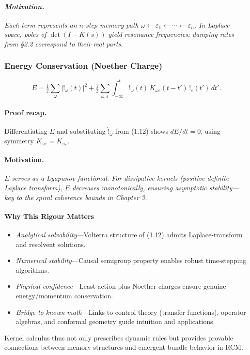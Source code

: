 \paragraph{\textit{Motivation.}}  
\textit{Each term represents an \(n\)-step memory path \(\omega\leftarrow\varepsilon_{1}\leftarrow\cdots\leftarrow\varepsilon_{n}\).  In Laplace space, poles of \(\det(I-K(s))\) yield resonance frequencies; damping rates from §2.2 correspond to their real parts.}

\medskip
\subsubsection{Energy Conservation (Noether Charge)}
\[
  E
  = \tfrac12\sum_{\omega}|!_{\omega}(t)|^{2}
    + \tfrac12\sum_{\omega,\varepsilon}
      \int_{-\infty}^{t}
        !_{\omega}(t)\,K_{\omega\varepsilon}(t-t')\,!_{\varepsilon}(t')\,dt'.
\]

\paragraph{Proof recap.}  
Differentiating \(E\) and substituting \(\dot{!}_{\omega}\) from (1.12) shows \(dE/dt=0\), using symmetry \(K_{\omega\varepsilon}=K_{\varepsilon\omega}\).

\paragraph{\textbf{Motivation.}}  
\textit{\(E\) serves as a Lyapunov functional.  For dissipative kernels (positive‐definite Laplace transform), \(E\) decreases monotonically, ensuring asymptotic stability—key to the spiral coherence bounds in Chapter 3.}

\medskip
\paragraph{Why This Rigour Matters}
\begin{itemize}
  \item \emph{Analytical solvability}—Volterra structure of (1.12) admits Laplace‐transform and resolvent solutions.
  \item \emph{Numerical stability}—Causal semigroup property enables robust time‐stepping algorithms.
  \item \emph{Physical confidence}—Least‐action plus Noether charges ensure genuine energy/momentum conservation.
  \item \emph{Bridge to known math}—Links to control theory (transfer functions), operator algebras, and conformal geometry guide intuition and applications.
\end{itemize}
Kernel calculus thus not only prescribes dynamic rules but provides provable connections
between memory structures and emergent bundle behavior in RCM.

